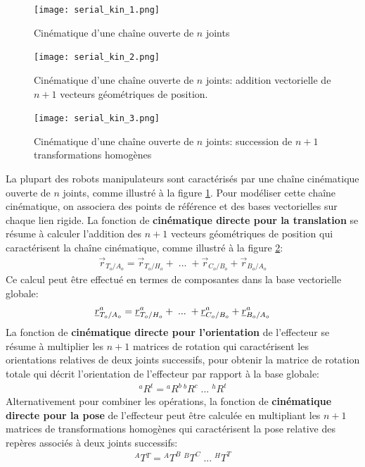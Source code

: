 \begin{figure}[p]
	\centering
	\texttt{[image: serial\_kin\_1.png]}
	\caption{Cinématique d'une chaîne ouverte de $n$ joints}
	\label{fig:serial_kin_1}
\end{figure}
\begin{figure}[p]
	\centering
	\texttt{[image: serial\_kin\_2.png]}
	\caption{Cinématique d'une chaîne ouverte de $n$ joints: addition vectorielle de $n+1$ vecteurs géométriques de position.}
	\label{fig:serial_kin_2}
\end{figure}
\begin{figure}[p]
	\centering
	\texttt{[image: serial\_kin\_3.png]}
	\caption{Cinématique d'une chaîne ouverte de $n$ joints: succession de $n+1$ transformations homogènes}
	\label{fig:serial_kin_3}
\end{figure}

La plupart des robots manipulateurs sont caractérisés par une chaîne cinématique ouverte de $n$ joints, comme illustré à la figure \ref{fig:serial_kin_1}. Pour modéliser cette chaîne cinématique, on associera des points de référence et des bases vectorielles sur chaque lien rigide. La fonction de \textbf{cinématique directe pour la translation} se résume à calculer l'addition des $n+1$ vecteurs géométriques de position qui caractérisent la chaîne cinématique, comme illustré à la figure \ref{fig:serial_kin_2}:
\begin{align}
	\vec{r}_{T_o/A_o} = \vec{r}_{T_o/H_o} + \; ... \; + \vec{r}_{C_o/B_o} + \vec{r}_{B_o/A_o}
	\label{eq:fwdkintransvec}
\end{align}
Ce calcul peut être effectué en termes de composantes dans la base vectorielle globale:
\begin{align}
	\underline{r}_{T_o/A_o}^a = \underline{r}_{T_o/H_o}^a + \; ... \; + \underline{r}_{C_o/B_o}^a + \underline{r}_{B_o/A_o}^a
	\label{eq:fwdkintrans}
\end{align}
La fonction de \textbf{cinématique directe pour l'orientation} de l'effecteur se résume à multiplier les $n+1$ matrices de rotation qui caractérisent les orientations relatives de deux joints successifs, pour obtenir la matrice de rotation totale qui décrit l'orientation de l'effecteur par rapport à la base globale:
\begin{align}
{}^aR^t = {}^aR^b \,  {}^bR^c \; ... \; {}^hR^t
\label{eq:fwdkinorien}
\end{align}
Alternativement pour combiner les opérations, la fonction de \textbf{cinématique directe pour la pose} de l'effecteur peut être calculée en multipliant les $n+1$ matrices de transformations homogènes qui caractérisent la pose relative des repères associés à deux joints successifs:
\begin{align}
{}^AT{}^T = {}^AT^B \;  {}^BT^C \; ... \; {}^HT^T
\label{eq:fwdkinhomo}
\end{align}




